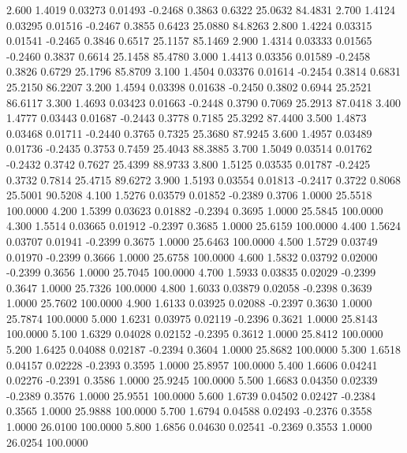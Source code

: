    2.600   1.4019   0.03273   0.01493  -0.2468   0.3863   0.6322  25.0632  84.4831
   2.700   1.4124   0.03295   0.01516  -0.2467   0.3855   0.6423  25.0880  84.8263
   2.800   1.4224   0.03315   0.01541  -0.2465   0.3846   0.6517  25.1157  85.1469
   2.900   1.4314   0.03333   0.01565  -0.2460   0.3837   0.6614  25.1458  85.4780
   3.000   1.4413   0.03356   0.01589  -0.2458   0.3826   0.6729  25.1796  85.8709
   3.100   1.4504   0.03376   0.01614  -0.2454   0.3814   0.6831  25.2150  86.2207
   3.200   1.4594   0.03398   0.01638  -0.2450   0.3802   0.6944  25.2521  86.6117
   3.300   1.4693   0.03423   0.01663  -0.2448   0.3790   0.7069  25.2913  87.0418
   3.400   1.4777   0.03443   0.01687  -0.2443   0.3778   0.7185  25.3292  87.4400
   3.500   1.4873   0.03468   0.01711  -0.2440   0.3765   0.7325  25.3680  87.9245
   3.600   1.4957   0.03489   0.01736  -0.2435   0.3753   0.7459  25.4043  88.3885
   3.700   1.5049   0.03514   0.01762  -0.2432   0.3742   0.7627  25.4399  88.9733
   3.800   1.5125   0.03535   0.01787  -0.2425   0.3732   0.7814  25.4715  89.6272
   3.900   1.5193   0.03554   0.01813  -0.2417   0.3722   0.8068  25.5001  90.5208
   4.100   1.5276   0.03579   0.01852  -0.2389   0.3706   1.0000  25.5518 100.0000
   4.200   1.5399   0.03623   0.01882  -0.2394   0.3695   1.0000  25.5845 100.0000
   4.300   1.5514   0.03665   0.01912  -0.2397   0.3685   1.0000  25.6159 100.0000
   4.400   1.5624   0.03707   0.01941  -0.2399   0.3675   1.0000  25.6463 100.0000
   4.500   1.5729   0.03749   0.01970  -0.2399   0.3666   1.0000  25.6758 100.0000
   4.600   1.5832   0.03792   0.02000  -0.2399   0.3656   1.0000  25.7045 100.0000
   4.700   1.5933   0.03835   0.02029  -0.2399   0.3647   1.0000  25.7326 100.0000
   4.800   1.6033   0.03879   0.02058  -0.2398   0.3639   1.0000  25.7602 100.0000
   4.900   1.6133   0.03925   0.02088  -0.2397   0.3630   1.0000  25.7874 100.0000
   5.000   1.6231   0.03975   0.02119  -0.2396   0.3621   1.0000  25.8143 100.0000
   5.100   1.6329   0.04028   0.02152  -0.2395   0.3612   1.0000  25.8412 100.0000
   5.200   1.6425   0.04088   0.02187  -0.2394   0.3604   1.0000  25.8682 100.0000
   5.300   1.6518   0.04157   0.02228  -0.2393   0.3595   1.0000  25.8957 100.0000
   5.400   1.6606   0.04241   0.02276  -0.2391   0.3586   1.0000  25.9245 100.0000
   5.500   1.6683   0.04350   0.02339  -0.2389   0.3576   1.0000  25.9551 100.0000
   5.600   1.6739   0.04502   0.02427  -0.2384   0.3565   1.0000  25.9888 100.0000
   5.700   1.6794   0.04588   0.02493  -0.2376   0.3558   1.0000  26.0100 100.0000
   5.800   1.6856   0.04630   0.02541  -0.2369   0.3553   1.0000  26.0254 100.0000
